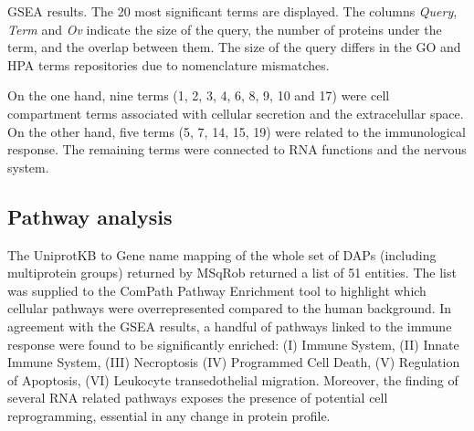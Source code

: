\begin{table}[!h]
\caption{\ac{GSEA} results. The 20 most significant terms are displayed. The columns \textit{Query}, \textit{Term} and \textit{Ov} indicate the size of the query, the number of proteins under the term, and the overlap between them. The size of the query differs in the GO and HPA terms repositories due to nomenclature mismatches.}
\label{tab:gsea}
\end{table}
\normalsize

On the one hand, nine terms (1, 2, 3, 4, 6, 8, 9, 10 and 17) were cell compartment terms associated with cellular secretion and the extracelullar space. On the other hand, five terms (5, 7, 14, 15, 19) were related to the immunological response. The remaining terms were connected to RNA functions and the nervous system.

\subsection{Pathway analysis}

The UniprotKB to Gene name mapping of the whole set of \ac{DAP}s (including multiprotein groups) returned by MSqRob returned a list of 51 entities. The list was supplied to the ComPath Pathway Enrichment tool to highlight which cellular pathways were overrepresented compared to the human background. In agreement with the \ac{GSEA} results, a handful of pathways linked to the immune response were found to be significantly enriched: (I) Immune System, (II) Innate Immune System, (III) Necroptosis (IV) Programmed Cell Death, (V) Regulation of Apoptosis, (VI) Leukocyte transedothelial migration. Moreover, the finding of several RNA related pathways exposes the presence of potential cell reprogramming, essential in any change in protein profile.

